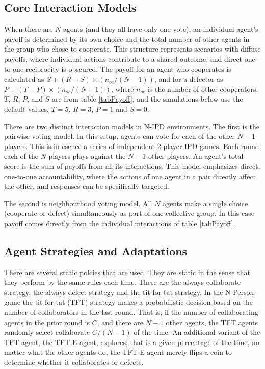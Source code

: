 \documentclass[]{llncs} %
\begin{document}
\subsection{Core Interaction Models}
When there are $N$ agents (and they all have only one vote), 
an individual agent's payoff is determined by its
own choice and the total number of other agents in the group who
chose to cooperate. This structure represents scenarios with diffuse
payoffs, where individual actions contribute to a shared outcome, and
direct one-to-one reciprocity is obscured. The payoff for an agent who
cooperates is calculated as $S + (R - S) \times (n_{oc} / (N - 1))$,
and for a defector as $P + (T - P) \times (n_{oc} / (N - 1))$, where
$n_{oc}$ is the number of other cooperators. $T$, $R$, $P$, and $S$ are
from table \ref {tabPayoff}, and the simulations below use the default values,
$T=5$, $R=3$, $P=1$ and $S=0$.

There are  two distinct interaction models in N-IPD environments.
The first is the pairwise voting model. In this setup, agents can
vote for each of the other $N-1$ players.  This is in esence a series of
independent 2-player IPD games. Each round each of the $N$ players plays
against the $N-1$ other players. An
agent's total score is the sum of payoffs from all its interactions. This
model emphasizes direct, one-to-one accountability,
where the actions of one agent in a pair directly affect the other,
and responses can be specifically targeted.

The second is neighbourhood voting model.  All $N$ agents make a
single choice (cooperate or defect) simultaneously as part of one
collective group. In this case payoff comes directly from the individual
interactions of table \ref {tabPayoff}.

\subsection{Agent Strategies and Adaptations}

There are several static polcies that are used.  They are static in
the sense that they perform by the same rules each time.  These are
the always collaborate strategy, the always defect strategy and the
tit-for-tat strategy.  In the N-Person game the tit-for-tat (TFT)
strategy makes a probabilistic decision based on the number of
collaborators in the last round.  That is, if the number of
collaborating agents in the prior round is $C$, and there are $N-1$
other agents, the TFT agents randomly select collaborate $C/(N-1)$ of
the time.  An additional variant of the TFT agent, the TFT-E agent,
explores; that is a given percentage of the time, no matter what the
other agents do, the TFT-E agent merely flips a coin to determine whether
it collaborates or defects.
\end{document}
